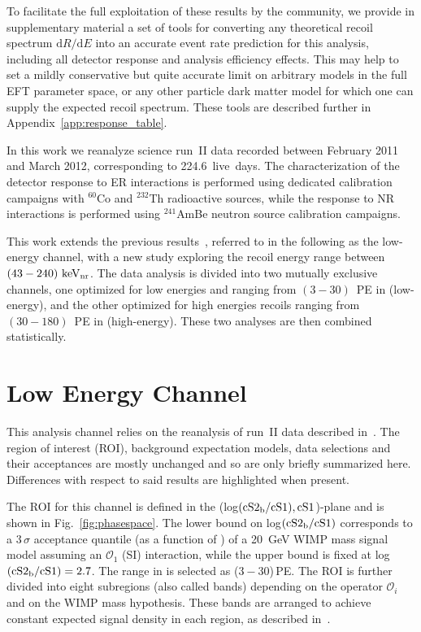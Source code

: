 To facilitate the full exploitation of these results by the community, we provide in supplementary material a set of tools for converting any theoretical recoil spectrum $\mathrm{d}R/\mathrm{d}E$ into an accurate event rate prediction for this analysis, including all detector response and analysis efficiency effects. This may help to set a mildly conservative but quite accurate limit on arbitrary models in the full EFT parameter space, or any other particle dark matter model for which one can supply the expected recoil spectrum. These tools are described further in Appendix~\ref{app:response_table}.

In this work we reanalyze science run~II data recorded between February 2011 and March 2012, corresponding to 224.6~live~days. The characterization of the detector response to ER interactions is performed using dedicated calibration campaigns with $^{60}$Co and $^{232}$Th radioactive sources, while the response to NR interactions is performed using $^{241}$AmBe neutron source calibration campaigns.
 
This work extends the previous results~\cite{xe100_run10_si,xe100_run_combination}, referred to in the following as the low-energy channel, with a new study exploring the recoil energy range between $(43-240)~\mathrm{keV_\mathrm{nr}}$. 
The data analysis is divided into two mutually exclusive channels, one optimized for low energies and ranging from $(3-30)$~PE in \cSi{} (low-energy), 
and the other optimized for high energies recoils ranging from $(30-180)$~PE in \cSi{} (high-energy). These two analyses are then combined statistically. 


\section{Low Energy Channel}
\label{subsec:LowE}
This analysis channel relies on the reanalysis of run~II data described in~\cite{xe100_run_combination}. The region of interest (ROI), background 
expectation models, data selections and their acceptances are mostly unchanged and so are only briefly summarized here. Differences with respect to said results are highlighted when present.

The ROI for this channel is defined in the (log$(\mathrm{cS2}_\mathrm{b}{}/\mathrm{cS1}{}),\mathrm{cS1}{}$)-plane and is shown in Fig.~\ref{fig:phasespace}.  The lower 
bound on log$(\mathrm{cS2}_\mathrm{b}{}/\mathrm{cS1}{})$ corresponds to a 3\,$\sigma$ acceptance quantile (as a function of \cSi{}) of a 20~GeV WIMP mass signal model assuming an $\mathcal{O}_1$ (SI) interaction, while the upper bound is fixed at log$(\mathrm{cS2}_\mathrm{b}{}/\mathrm{cS1}{})=2.7$.
The range in \cSi{} is selected as ($3-30$)\,PE. 
The ROI is further divided into eight subregions (also called bands) depending on the operator $\mathcal{O}_i$ and on the WIMP mass hypothesis. 
These bands are arranged to achieve constant expected signal density in each region, as described in~\cite{xe100_run_combination}.

